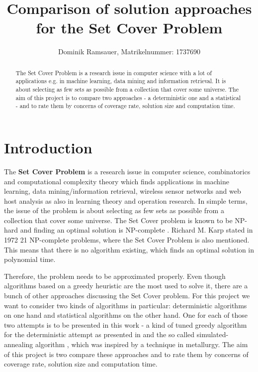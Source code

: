 \documentclass[a4paper]{article}
\title{Comparison of solution approaches for the Set Cover Problem}
\author{Dominik Ramsauer, Matrikelnummer: 1737690}
\affil{Lehrstuhl für Informationswissenschaft, Universität Regensburg}
\begin{document}
\maketitle

\begin{abstract}
The Set Cover Problem is a research issue in computer science with a lot of applications e.g. in machine learning, data mining and information retrieval. It is about selecting as few sets as possible from a collection that cover some universe. The aim of this project is to compare two approaches - a deterministic one and a statistical - and to rate them by concerns of coverage rate, solution size and computation time. 
\end{abstract}

\section{Introduction}

The \textbf{Set Cover Problem} is a research issue in computer science, combinatorics and computational complexity theory which finds applications in machine learning, data mining/information retrieval\cite{saha2009maximum}, wireless sensor networks\cite{Zorbas2010} and web host analysis\cite{chierichetti2010max} as also in learning theory\cite{kearns1994introduction} and operation research\cite{grossman1997computational}. In simple terms, the issue of the problem is about selecting as few sets as possible from a collection that cover some universe\cite{Cormode,Feige1998}. The Set Cover problem is known to be NP-hard and finding an optimal solution is NP-complete \cite{Indyk}. Richard M. Karp stated in 1972 21 NP-complete problems\cite{Karp2010}, where the Set Cover Problem is also mentioned. This means that there is no algorithm existing, which finds an optimal solution in polynomial time. 

Therefore, the problem needs to be approximated properly. Even though algorithms based on a greedy heuristic are the most used to solve it, there are a bunch of other approaches discussing the Set Cover problem. For this project we want to consider two kinds of algorithms in particular: deterministic algorithms on one hand and statistical algorithms on the other hand. One for each of those two attempts is to be presented in this work - a kind of tuned greedy algorithm for the deterministic attempt as presented in \cite{Cormode} and the so called simulated-annealing algorithm \cite{Jacobs1995,balas1980set,Kirkpatrick1983, vcerny1985thermodynamical}, which was inspired by a technique in metallurgy. The aim of this project is two compare these approaches and to rate them by concerns of coverage rate, solution size and computation time.
\end{document}
